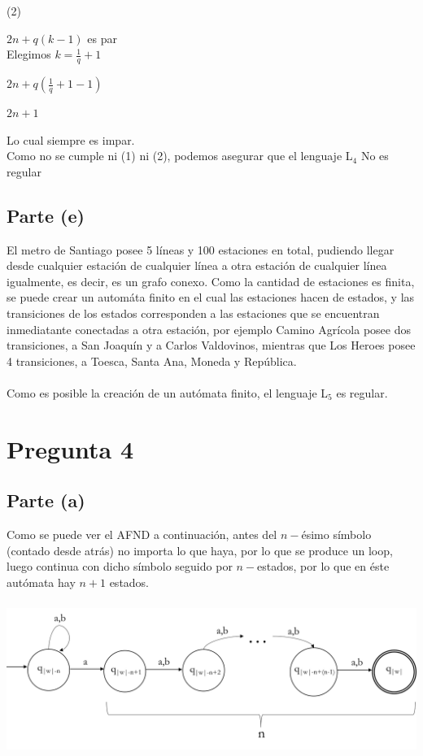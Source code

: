 \documentclass[11pt,letterpaper]{article}
\begin{document}
(2) 

$2n+q(k-1)$ es par
 \\
 
Elegimos $k = \frac{1}{q} + 1$

$2n+q(\frac{1}{q} + 1 -1)$

$2n+1$

Lo cual siempre es impar.
 \\

Como no se cumple ni (1) ni (2), podemos asegurar que el lenguaje L$_{4}$ No es regular


\subsection{Parte (e)}
El metro de Santiago posee 5 líneas y 100 estaciones en total, pudiendo llegar desde cualquier estación de cualquier línea a otra estación de cualquier línea igualmente, es decir, es un grafo conexo. Como la cantidad de estaciones es finita, se puede crear un automáta finito en el cual las estaciones hacen de estados, y las transiciones de los estados corresponden a las estaciones que se encuentran inmediatante conectadas a otra estación, por ejemplo Camino Agrícola posee dos transiciones, a San Joaquín y a Carlos Valdovinos, mientras que Los Heroes posee 4 transiciones, a Toesca, Santa Ana, Moneda y República.
 \\
 \\
Como es posible la creación de un autómata finito, el lenguaje L$_{5}$ es regular.


\section{Pregunta 4}
\subsection{Parte (a)}
Como se puede ver el AFND a continuación, antes del $n-$ésimo símbolo (contado desde atrás) no importa lo que haya, por lo que se produce un loop, luego continua con dicho símbolo seguido por $n-$estados, por lo que en éste autómata hay $n+1$ estados.

\includegraphics[height=5cm]{tarea_4-a.png}
\end{document}
